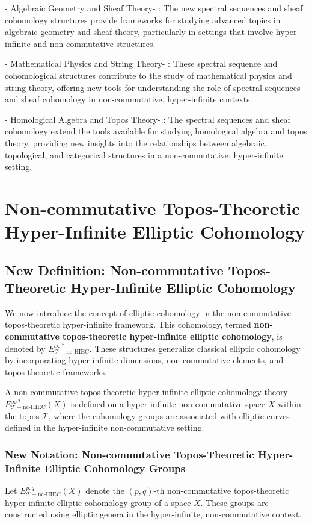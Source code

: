 \documentclass{article}
\begin{document}
-  Algebraic Geometry and Sheaf Theory- : The new spectral sequences and sheaf cohomology structures provide frameworks for studying advanced topics in algebraic geometry and sheaf theory, particularly in settings that involve hyper-infinite and non-commutative structures.

-  Mathematical Physics and String Theory- : These spectral sequence and cohomological structures contribute to the study of mathematical physics and string theory, offering new tools for understanding the role of spectral sequences and sheaf cohomology in non-commutative, hyper-infinite contexts.

-  Homological Algebra and Topos Theory- : The spectral sequences and sheaf cohomology extend the tools available for studying homological algebra and topos theory, providing new insights into the relationships between algebraic, topological, and categorical structures in a non-commutative, hyper-infinite setting.



\section{Non-commutative Topos-Theoretic Hyper-Infinite Elliptic Cohomology}
\subsection{New Definition: Non-commutative Topos-Theoretic Hyper-Infinite Elliptic Cohomology}
We now introduce the concept of elliptic cohomology in the non-commutative topos-theoretic hyper-infinite framework. This cohomology, termed \textbf{non-commutative topos-theoretic hyper-infinite elliptic cohomology}, is denoted by \(E_{\mathcal{T}-\text{nc-HIEC}}^{\infty *}\). These structures generalize classical elliptic cohomology by incorporating hyper-infinite dimensions, non-commutative elements, and topos-theoretic frameworks.

A non-commutative topos-theoretic hyper-infinite elliptic cohomology theory \(E_{\mathcal{T}-\text{nc-HIEC}}^{\infty *}(X)\) is defined on a hyper-infinite non-commutative space \(X\) within the topos \(\mathcal{T}\), where the cohomology groups are associated with elliptic curves defined in the hyper-infinite non-commutative setting.

\subsubsection{New Notation: Non-commutative Topos-Theoretic Hyper-Infinite Elliptic Cohomology Groups}
Let \(E_{\mathcal{T}-\text{nc-HIEC}}^{p,q}(X)\) denote the \((p,q)\)-th non-commutative topos-theoretic hyper-infinite elliptic cohomology group of a space \(X\). These groups are constructed using elliptic genera in the hyper-infinite, non-commutative context.
\end{document}

